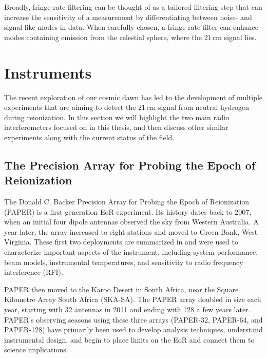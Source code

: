 Broadly, fringe-rate filtering can be thought of as a tailored filtering step that can increase the sensitivity of a measurement by differentiating between noise- and signal-like modes in data. When carefully chosen, a fringe-rate filter can enhance modes containing emission from the celestial sphere, where the $21$\,cm signal lies.

\section{Instruments}

The recent exploration of our cosmic dawn has led to the development of multiple experiments that are aiming to detect the $21$\,cm signal from neutral hydrogen during reionization. In this section we will highlight the two main radio interferometers focused on in this thesis, and then discuss other similar experiments along with the current status of the field. 

\subsection{The Precision Array for Probing the Epoch of Reionization}
\label{sec:PAPER_intro}

The Donald C. Backer Precision Array for Probing the Epoch of Reionization (PAPER) is a first generation EoR experiment. Its history dates back to 2007, when an initial four dipole antennas observed the sky from Western Australia. A year later, the array increased to eight stations and moved to Green Bank, West Virginia. These first two deployments are summarized in \citet{parsons_et_al2010} and were used to characterize important aspects of the instrument, including system performance, beam models, instrumental temperatures, and sensitivity to radio frequency interference (RFI). 

PAPER then moved to the Karoo Desert in South Africa, near the Square Kilometre Array South Africa (SKA-SA). The PAPER array doubled in size each year, starting with 32 antennas in 2011 and ending with 128 a few years later. PAPER's observing seasons using these three arrays (PAPER-32, PAPER-64, and PAPER-128) have primarily been used to develop analysis techniques, understand instrumental design, and begin to place limits on the EoR and connect them to science implications.

